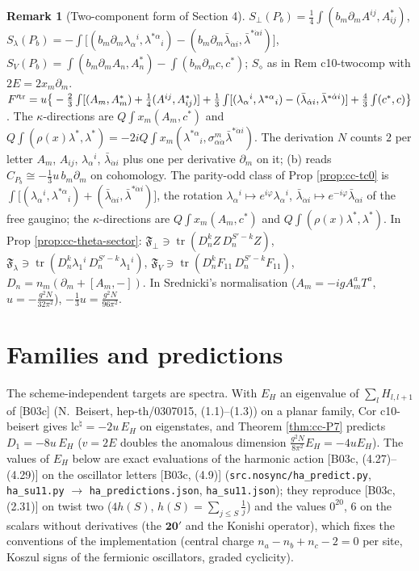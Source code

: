 \documentclass[11pt]{article}
\numberwithin{equation}{section}
\theoremstyle{plain}
\theoremstyle{definition}
\newtheorem{remark}[theorem]{Remark}
\begin{document}
\begin{remark}[Two-component form of Section 4]
\label{rem:cc-twocomp3}
$S_\perp(P_b)=\tfrac14\int(b_m\partial_mA^{ij},A^*_{ij})$, $S_\lambda(P_b)=-\int\big[(b_m\partial_m\lambda_\alpha{}^i,\lambda^{*\alpha}{}_i)-(b_m\partial_m\bar\lambda_{\dot\alpha i},\bar\lambda^{*\dot\alpha i})\big]$, $S_V(P_b)=\int(b_m\partial_mA_n,A^*_n)-\int(b_m\partial_mc,c^*)$; $S_\diamond$ as in Rem c10-twocomp with $2E=2x_m\partial_m$. $F'^{\rm tr}=u\big\{-\tfrac23\int[(A_m,A^*_m)+\tfrac14(A^{ij},A^*_{ij})]+\tfrac13\int[(\lambda_\alpha{}^i,\lambda^{*\alpha}{}_i)-(\bar\lambda_{\dot\alpha i},\bar\lambda^{*\dot\alpha i})]+\tfrac43\int(c^*,c)\big\}$. The $\kappa$-directions are $Q\int x_m(A_m,c^*)$ and $Q\int(\rho(x)\lambda^*,\lambda^*)=-2iQ\int x_m(\lambda^{*\alpha}{}_i,\sigma^m_{\alpha\dot\alpha}\bar\lambda^{*\dot\alpha i})$. The derivation $N$ counts $2$ per letter $A_m$, $A_{ij}$, $\lambda_\alpha{}^i$, $\bar\lambda_{\dot\alpha i}$ plus one per derivative $\partial_m$ on it; (b) reads $C_{P_b}\cong-\tfrac13u\,b_m\partial_m$ on cohomology. The parity-odd class of Prop \ref{prop:cc-tc0} is $\int\big[(\lambda_\alpha{}^i,\lambda^{*\alpha}{}_i)+(\bar\lambda_{\dot\alpha i},\bar\lambda^{*\dot\alpha i})\big]$, the rotation $\lambda_\alpha{}^i\mapsto e^{i\varphi}\lambda_\alpha{}^i$, $\bar\lambda_{\dot\alpha i}\mapsto e^{-i\varphi}\bar\lambda_{\dot\alpha i}$ of the free gaugino; the $\kappa$-directions are $Q\int x_m(A_m,c^*)$ and $Q\int(\rho(x)\lambda^*,\lambda^*)$. In Prop \ref{prop:cc-theta-sector}: $\mathfrak F_\perp\ni\operatorname{tr}(D_n^kZ\,D_n^{S'-k}Z)$, $\mathfrak F_\lambda\ni\operatorname{tr}(D_n^k\lambda_1{}^i\,D_n^{S'-k}\lambda_1{}^i)$, $\mathfrak F_V\ni\operatorname{tr}(D_n^kF_{11}\,D_n^{S'-k}F_{11})$, $D_n=n_m(\partial_m+[A_m,-])$. In Srednicki's normalisation ($A_m=-igA^a_mT^a$, $u=-\tfrac{g^2N}{32\pi^2}$), $-\tfrac13u=\tfrac{g^2N}{96\pi^2}$.
\end{remark}

\section{Families and predictions}
\label{sec:cc-families}

The scheme-independent targets are spectra. With $E_H$ an eigenvalue of $\sum_lH_{l,l+1}$ of [B03c] (N.~Beisert, hep-th/0307015, (1.1)--(1.3)) on a planar family, Cor c10-beisert gives $\mathrm{lc}^\natural=-2u\,E_H$ on eigenstates, and Theorem \ref{thm:cc-P7} predicts $D_1=-8u\,E_H$ ($v=2E$ doubles the anomalous dimension $\tfrac{g^2N}{8\pi^2}E_H=-4uE_H$). The values of $E_H$ below are exact evaluations of the harmonic action [B03c, (4.27)--(4.29)] on the oscillator letters [B03c, (4.9)] (\texttt{src.nosync/ha\_predict.py}, \texttt{ha\_su11.py} $\to$ \texttt{ha\_predictions.json}, \texttt{ha\_su11.json}); they reproduce [B03c, (2.31)] on twist two ($4h(S)$, $h(S)=\sum_{j\le S}\tfrac1j$) and the values $0^{20}$, $6$ on the scalars without derivatives (the $\mathbf{20'}$ and the Konishi operator), which fixes the conventions of the implementation (central charge $n_a-n_b+n_c-2=0$ per site, Koszul signs of the fermionic oscillators, graded cyclicity).
\end{document}
